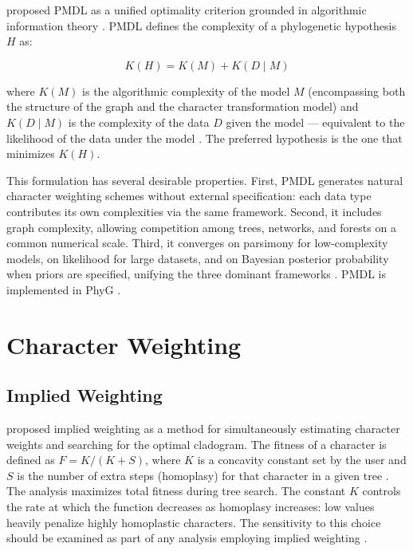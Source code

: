 \textcite{wheelervaron2025} proposed PMDL as a unified optimality criterion grounded in algorithmic information theory \parencite{kolmogorov1968,livitanyi1997}. PMDL defines the complexity of a phylogenetic hypothesis $H$ as:

\begin{equation}
    K(H) = K(M) + K(D \mid M)
\end{equation}

where $K(M)$ is the algorithmic complexity of the model $M$ (encompassing both the structure of the graph and the character transformation model) and $K(D \mid M)$ is the complexity of the data $D$ given the model --- equivalent to the likelihood of the data under the model \parencite{wheelervaron2025}. The preferred hypothesis is the one that minimizes $K(H)$.

This formulation has several desirable properties. First, PMDL generates natural character weighting schemes without external specification: each data type contributes its own complexities via the same framework. Second, it includes graph complexity, allowing competition among trees, networks, and forests on a common numerical scale. Third, it converges on parsimony for low-complexity models, on likelihood for large datasets, and on Bayesian posterior probability when priors are specified, unifying the three dominant frameworks \parencite{wheelervaron2025}. PMDL is implemented in PhyG \parencite{wheeleretal2024}.

\section{Character Weighting}
\label{sec:pesos}

\subsection{Implied Weighting}

\textcite{goloboff1993b} proposed implied weighting as a method for simultaneously estimating character weights and searching for the optimal cladogram. The fitness of a character is defined as $F = K / (K + S)$, where $K$ is a concavity constant set by the user and $S$ is the number of extra steps (homoplasy) for that character in a given tree \parencite{wheeleretal2006}. The analysis maximizes total fitness during tree search. The constant $K$ controls the rate at which the function decreases as homoplasy increases: low values heavily penalize highly homoplastic characters. The sensitivity to this choice should be examined as part of any analysis employing implied weighting \parencite{goloboff1993b,goloboff2013}.

